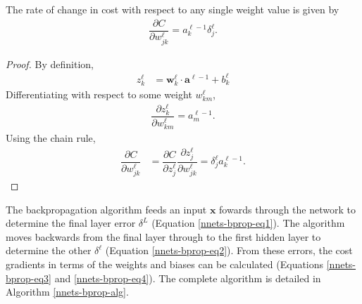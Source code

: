 \begin{lemma}
	The rate of change in cost with respect to any single weight value is given by
	\begin{align}\label{nnets-bprop-eq4}
		\dfrac{\partial C}{\partial w_{jk}^\ell} = a_k^{\ell-1}\delta_j^\ell.
	\end{align}
\end{lemma}
\begin{proof}
	By definition,
	\begin{align}
		z_k^\ell & = \mathbf{w}_k^\ell\cdot\mathbf{a}^{\ell-1} + b_k^\ell
	\end{align}
	Differentiating with respect to some weight $w_{km}^\ell$,
	\begin{align}
		\dfrac{\partial z_k^\ell}{\partial w_{km}^\ell} = a_m^{\ell-1}.
	\end{align}
	Using the chain rule,
	\begin{align}	
		\dfrac{\partial C}{\partial w_{jk}^\ell} & = \dfrac{\partial C}{\partial z_j^\ell}\dfrac{\partial z_j^\ell}{\partial w_{jk}^\ell} = \delta_j^\ell a_k^{\ell-1}.
	\end{align}
\end{proof}


The backpropagation algorithm feeds an input $\mathbf{x}$ fowards through the network to determine the final layer error $\delta^L$ (Equation \eqref{nnets-bprop-eq1}).  The algorithm moves backwards from the final layer through to the first hidden layer to determine the other $\delta^\ell$ (Equation \eqref{nnets-bprop-eq2}). From these errors, the cost gradients in terms of the weights and biases can be calculated (Equations \eqref{nnets-bprop-eq3} and \eqref{nnets-bprop-eq4}). The complete algorithm is detailed in Algorithm \ref{nnets-bprop-alg}.

